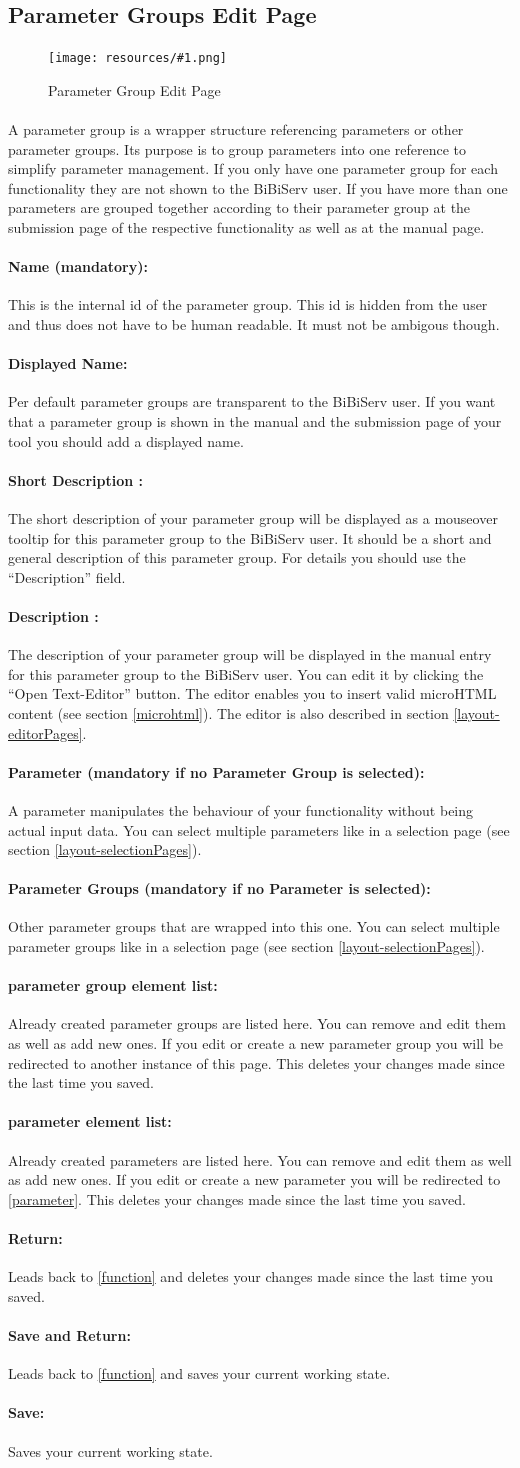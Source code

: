 \documentclass[a4paper,10pt]{book}
\newcommand{\bigpic}[1]{\texttt{[image: resources/\#1.png]}}
\newcommand{\shortDescr}[2]{\paragraph{Short Description #2:} The short description of your #1 will be displayed as a mouseover tooltip for this #1 to the BiBiServ user. It should be a short and general description of this #1. For details you should use the ``Description'' field.}
\newcommand{\descr}[2]{\paragraph{Description #2:} The description of your #1 will be displayed in the manual entry for this #1 to the BiBiServ user. You can edit it by clicking the ``Open Text-Editor'' button. The editor enables you to insert valid microHTML content (see section \ref{microhtml}). The editor is also described in section \ref{layout-editorPages}.}
\newcommand{\buttonsDetail}[1]{
\paragraph{Return:} Leads back to #1 and deletes your changes made since the last time you saved.
\paragraph{Save and Return:} Leads back to #1 and saves your current working state.
\paragraph{Save:} Saves your current working state.
}
\newcommand{\newElem}[2]{
\paragraph{#1 element list:} Already created #1s are listed here. You can remove and edit them as well as add new ones. If you edit or create a new #1 you will be redirected to #2. This deletes your changes made since the last time you saved.
}
\begin{document}
\subsection{Parameter Groups Edit Page}
\label{paramGroup}

\begin{figure}
 \bigpic{paramGroup}
 \caption{Parameter Group Edit Page}
\end{figure}

\paragraph{} A parameter group is a wrapper structure referencing parameters or other parameter groups. Its purpose is to group parameters into one reference to simplify parameter management. If you only have one parameter group for each functionality they are not shown to the BiBiServ user. If you have more than one parameters are grouped together according to their parameter group at the submission page of the respective functionality as well as at the manual page.
\paragraph{Name (mandatory):} This is the internal id of the parameter group. This id is hidden from the user and thus does not have to be human readable. It must not be ambigous though.
\paragraph{Displayed Name:} Per default parameter groups are transparent to the BiBiServ user. If you want that a parameter group is shown in the manual and the submission page of your tool you should add a displayed name.
\shortDescr{parameter group}{}
\descr{parameter group}{}
\paragraph{Parameter (mandatory if no Parameter Group is selected):} A parameter manipulates the behaviour of your functionality without being actual input data. You can select multiple parameters like in a selection page (see section \ref{layout-selectionPages}).
\paragraph{Parameter Groups (mandatory if no Parameter is selected):} Other parameter groups that are wrapped into this one. You can select multiple parameter groups like in a selection page (see section \ref{layout-selectionPages}).
\newElem{parameter group}{another instance of this page}
\newElem{parameter}{\ref{parameter}}
\buttonsDetail{\ref{function}}
\end{document}
